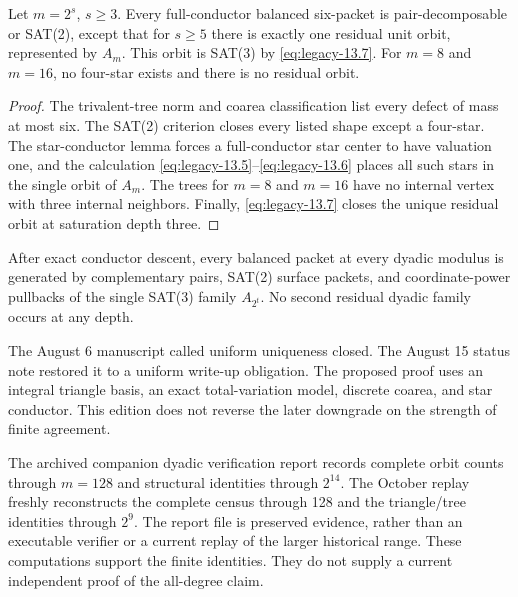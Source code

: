 \begin{manuscriptclaim}
Let \(m=2^s\), \(s\ge3\). Every full-conductor balanced six-packet is pair-decomposable or SAT(2), except that for \(s\ge5\) there is exactly one residual unit orbit, represented by \(A_m\). This orbit is SAT(3) by \eqref{eq:legacy-13.7}. For \(m=8\) and \(m=16\), no four-star exists and there is no residual orbit.
\end{manuscriptclaim}
\begin{proof}
The trivalent-tree norm and coarea classification list every defect of mass at most six. The SAT(2) criterion closes every listed shape except a four-star. The star-conductor lemma forces a full-conductor star center to have valuation one, and the calculation \eqref{eq:legacy-13.5}--\eqref{eq:legacy-13.6} places all such stars in the single orbit of \(A_m\). The trees for \(m=8\) and \(m=16\) have no internal vertex with three internal neighbors. Finally, \eqref{eq:legacy-13.7} closes the unique residual orbit at saturation depth three.
\end{proof}

\begin{manuscriptclaim}
After exact conductor descent, every balanced packet at every dyadic modulus is generated by complementary pairs, SAT(2) surface packets, and coordinate-power pullbacks of the single SAT(3) family \(A_{2^t}\). No second residual dyadic family occurs at any depth.
\end{manuscriptclaim}

\begin{resultbox}
The August 6 manuscript called uniform uniqueness closed. The August 15 status note restored it to a uniform write-up obligation. The proposed proof uses an integral triangle basis, an exact total-variation model, discrete coarea, and star conductor. This edition does not reverse the later downgrade on the strength of finite agreement.
\end{resultbox}

The archived companion dyadic verification report records complete orbit counts through $m=128$ and structural identities through $2^{14}$. The October replay freshly reconstructs the complete census through 128 and the triangle/tree identities through $2^9$. The report file is preserved evidence, rather than an executable verifier or a current replay of the larger historical range. These computations support the finite identities. They do not supply a current independent proof of the all-degree claim.

